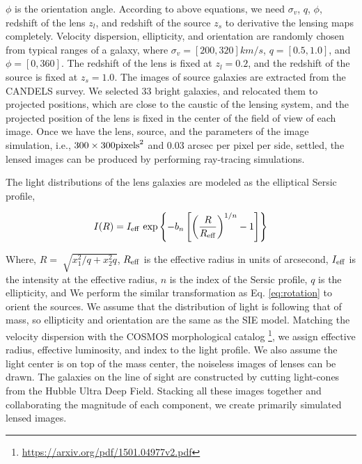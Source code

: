 \documentclass{emulateapj}
\begin{document}
$\phi$ is the orientation angle.  According to above equations, we
need $\sigma_v$, $q$, $\phi$, redshift of the lens $z_l$, and redshift
of the source $z_s$ to derivative the lensing maps completely.
Velocity dispersion, ellipticity, and orientation are randomly chosen
from typical ranges of a galaxy, where $\sigma_v = [200, 320] km/s$,
$q = [0.5, 1.0]$, and $\phi = [0, 360]$. The redshift of the lens is
fixed at $z_l = 0.2$, and the redshift of the source is fixed at $z_s
= 1.0$. The images of source galaxies are extracted from the CANDELS
survey. We selected 33 bright galaxies, and relocated them to
projected positions, which are close to the caustic of the lensing
system, and the projected position of the lens is fixed in the center
of the field of view of each image. Once we have the lens, source, and
the parameters of the image simulation, i.e., $300 \times 300 {\rm
  pixels}^2$ and 0.03 arcsec per pixel per side, settled, the lensed
images can be produced by performing ray-tracing simulations.

The light distributions of the lens galaxies  are modeled as the elliptical Sersic profile,

\begin{equation}
I(R) = I_{\rm eff}~{\rm exp} \left\lbrace -b_{n} \left[ \left(
  \frac{R}{R_{\rm eff}}\right)^{1/n} - 1 \right ] \right\rbrace
\end{equation}


Where, $R = \sqrt[]{x_1^2 /q+x_2^2 q }$, $R_{\rm eff}$ is the
effective radius in units of arcsecond, $I_{\rm eff}$ is the intensity
at the effective radius, $n$ is the index of the Sersic profile, $q$
is the ellipticity, and We perform the similar transformation as
Eq. \ref{eq:rotation} to orient the sources.  We assume that the
distribution of light is following that of mass, so ellipticity and
orientation are the same as the SIE model. Matching the velocity
dispersion with the COSMOS morphological
catalog \footnote{\url{https://arxiv.org/pdf/1501.04977v2.pdf}}, we
assign effective radius, effective luminosity, and index to the light
profile.  We also assume the light center is on top of the mass
center, the noiseless images of lenses can be drawn. The galaxies on
the line of sight are constructed by cutting light-cones from the
Hubble Ultra Deep Field.  Stacking all these images together and
collaborating the magnitude of each component, we create primarily
simulated lensed images.
\end{document}
